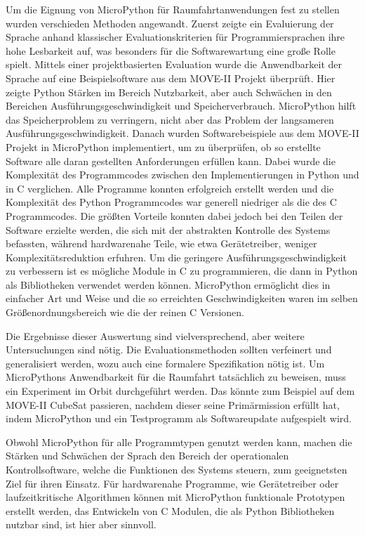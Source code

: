 Um die Eignung von MicroPython für Raumfahrtanwendungen fest zu stellen wurden verschieden Methoden angewandt. Zuerst zeigte ein Evaluierung der Sprache anhand klassischer Evaluationskriterien für Programmiersprachen ihre hohe Lesbarkeit auf, was besonders für die Softwarewartung eine große Rolle spielt. Mittels einer projektbasierten Evaluation wurde die Anwendbarkeit der Sprache auf eine Beispielsoftware aus dem MOVE-II Projekt überprüft. Hier zeigte Python Stärken im Bereich Nutzbarkeit, aber auch Schwächen in den Bereichen Ausführungsgeschwindigkeit und Speicherverbrauch. MicroPython hilft das Speicherproblem zu verringern, nicht aber das Problem der langsameren Ausführungsgeschwindigkeit. Danach wurden Softwarebeispiele aus dem MOVE-II Projekt in MicroPython implementiert, um zu überprüfen, ob so erstellte Software alle daran gestellten Anforderungen erfüllen kann. Dabei wurde die Komplexität des Programmcodes zwischen den Implementierungen in Python und in C verglichen. Alle Programme konnten erfolgreich erstellt werden und die Komplexität des Python Programmcodes war generell niedriger als die des C Programmcodes. Die größten Vorteile konnten dabei jedoch bei den Teilen der Software erzielte werden, die sich mit der abstrakten Kontrolle des Systems befassten, während hardwarenahe Teile, wie etwa Gerätetreiber, weniger Komplexitätsreduktion erfuhren. Um die geringere Ausführungsgeschwindigkeit zu verbessern ist es mögliche Module in C zu programmieren, die dann in Python als Bibliotheken verwendet werden können. MicroPython ermöglicht dies in einfacher Art und Weise und die so erreichten Geschwindigkeiten waren im selben Größenordnungsbereich wie die der reinen C Versionen.

Die Ergebnisse dieser Auswertung sind vielversprechend, aber weitere Untersuchungen sind nötig. Die Evaluationsmethoden sollten verfeinert und generalisiert werden, wozu auch eine formalere Spezifikation nötig ist. Um MicroPythons Anwendbarkeit für die Raumfahrt tatsächlich zu beweisen, muss ein Experiment im Orbit durchgeführt werden. Das könnte zum Beispiel auf dem MOVE-II CubeSat passieren, nachdem dieser seine Primärmission erfüllt hat, indem MicroPython und ein Testprogramm als Softwareupdate aufgespielt wird.

Obwohl MicroPython für alle Programmtypen genutzt werden kann, machen die Stärken und Schwächen der Sprach den Bereich der operationalen Kontrollsoftware, welche die Funktionen des Systems steuern, zum geeignetsten Ziel für ihren Einsatz. Für hardwarenahe Programme, wie Gerätetreiber oder laufzeitkritische Algorithmen können mit MicroPython funktionale Prototypen erstellt werden, das Entwickeln von C Modulen, die als Python Bibliotheken nutzbar sind, ist hier aber sinnvoll.

